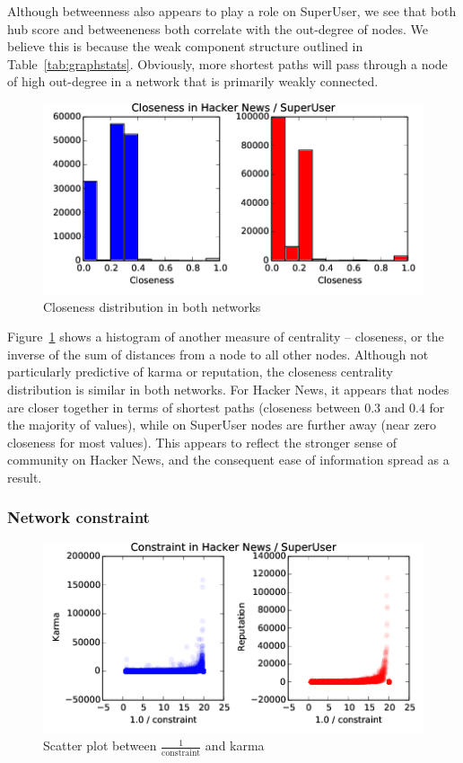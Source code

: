 \documentclass[11pt]{article}
\begin{document}
Although betweenness also appears to play a role on SuperUser, we see that
both hub score and betweeneness both correlate with the out-degree of nodes.
We believe this is because the weak component structure outlined in 
Table~\ref{tab:graphstats}. Obviously, more shortest paths will pass through a
node of high out-degree in a network that is primarily weakly connected.

\begin{figure}[h]
\centering
\includegraphics[width=\linewidth]{closeness-png}
\caption{Closeness distribution in both networks}
\label{fig:closeness}

\end{figure}

Figure~\ref{fig:closeness} shows a histogram of another measure of centrality --
closeness, or the inverse of the sum of distances from a node to all other
nodes.  Although not particularly predictive of karma or reputation, the
closeness centrality distribution is similar in both networks. For Hacker News,
it appears that nodes are closer together in terms of shortest paths (closeness
between $0.3$ and $0.4$ for the majority of values), while on SuperUser nodes
are further away (near zero closeness for most values). This appears to reflect
the stronger sense of community on Hacker News, and the consequent ease of
information spread as a result.

\subsubsection{Network constraint}
\label{sec:constraint}

\begin{figure}[h]
\centering
\includegraphics[width=\linewidth]{constraint_correlation-png}
\caption{Scatter plot between $\frac{1}{\text{constraint}}$ and karma}
\end{figure}
\end{document}
